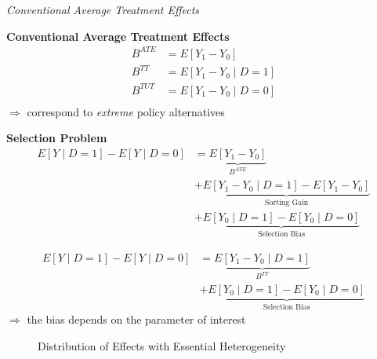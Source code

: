 \begin{frame}\begin{center}
		\LARGE\textit{Conventional Average Treatment Effects}
\end{center}\end{frame}
\begin{frame}
	\textbf{Conventional Average Treatment Effects}	
	\begin{align*}
		B^{ATE} & = E[Y_1 - Y_0 ]\\
		B^{TT} & = E[Y_1 - Y_0 \mid D = 1]\\
		B^{TUT} & = E[Y_1 - Y_0 \mid D = 0]\\
	\end{align*}	
	\(\Rightarrow\) correspond to \emph{extreme} policy alternatives	
\end{frame}
\begin{frame}
	\textbf{Selection Problem}	
	\begin{align*}
		E[Y\mid D = 1] - E[Y\mid D = 0] & = \underbrace{E[Y_1 - Y_0]}_{B^{ATE}} \\
		& + \underbrace{E[Y_1 - Y_0 \mid D = 1] - E[Y_1 - Y_0]}_{\text{Sorting Gain}} \\
		& + \underbrace{E[Y_0\mid D = 1] - E[Y_0 \mid D = 0]}_{\text{Selection Bias}}
	\end{align*}	
\end{frame}
\begin{frame}	
	\begin{align*}
		E[Y\mid D = 1] - E[Y\mid D = 0] & = \underbrace{E[Y_1 - Y_0\mid D = 1]}_{B^{TT}} \\
		& + \underbrace{E[Y_0\mid D= 1]- E[Y_0 \mid D = 0]}_{\text{Selection Bias}}
	\end{align*}	
	\(\Rightarrow\) the bias depends on the parameter of interest	
\end{frame}
\begin{frame}
	\begin{figure}\caption{Distribution of Effects with Essential Heterogeneity}
	\end{figure}
\end{frame}
